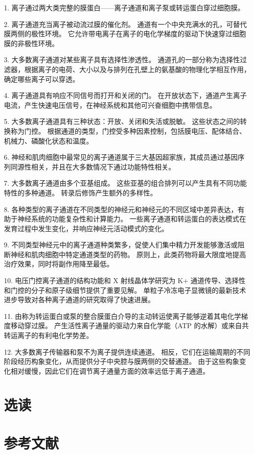 1. 离子通过两大类完整的膜蛋白——离子通道和离子泵或转运蛋白穿过细胞膜。 

2. 离子通道充当离子被动流过膜的催化剂。 通道有一个中央充满水的孔，可替代膜两侧的极性环境。 它允许带电离子在离子的电化学梯度的驱动下快速穿过细胞膜的非极性环境。 

3. 大多数离子通道对某些离子具有选择性渗透性。 通道孔的一部分称为选择性过滤器，根据离子的电荷、大小以及与排列在孔壁上的氨基酸的物理化学相互作用，确定哪些离子可以穿透。 

4. 离子通道具有响应不同信号而打开和关闭的门。 在开放状态下，通道产生离子电流，产生快速电压信号，在神经系统和其他可兴奋细胞中携带信息。 

5. 大多数离子通道具有三种状态：开放、关闭和失活或脱敏。 这些状态之间的转换称为门控。 根据通道的类型，门控受多种因素控制，包括膜电压、配体结合、机械力、磷酸化状态和温度。 

6. 神经和肌肉细胞中最常见的离子通道属于三大基因超家族，其成员通过基因序列同源性相关，并且在大多数情况下通过功能特性相关。 

7. 大多数离子通道由多个亚基组成。 这些亚基的组合排列可以产生具有不同功能特性的多种通道。 转录后修饰产生额外的多样性。 

8. 各种类型的离子通道在不同类型的神经元和神经元的不同区域中差异表达，有助于神经系统的功能复杂性和计算能力。 一些离子通道和转运蛋白的表达模式在发育过程中发生变化，并响应神经元活动模式的变化。 

9. 不同类型神经元中的离子通道种类繁多，促使人们集中精力开发能够激活或阻断神经和肌肉细胞中特定通道类型的药物。 原则上，此类药物将最大限度地提高治疗效果，同时将副作用降至最低。 

10. 电压门控离子通道的结构功能和 X 射线晶体学研究为 K+ 通道传导、选择性和门控的分子和原子级细节提供了重要见解。 单粒子冷冻电子显微镜的最新技术进步导致对各种离子通道的研究取得了快速进展。 

11. 由称为转运蛋白或泵的整合膜蛋白介导的主动转运使离子能够逆着其电化学梯度移动穿过膜。 产生活性离子通量的驱动力来自化学能（ATP 的水解）或来自共转运离子的有利电化学势差。 

12. 大多数离子传输器和泵不为离子提供连续通道。 相反，它们在运输周期的不同阶段经历构象变化，从而提供分子中央腔与膜两侧的交替通道。 由于这些构象变化相对缓慢，因此它们在调节离子通量方面的效率远低于离子通道。

\section{选读}

\section{参考文献}
